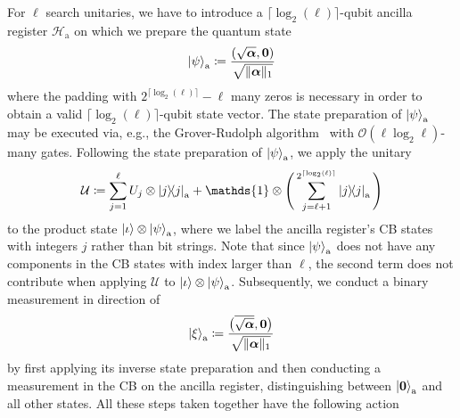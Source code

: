 \documentclass[10pt,conference]{IEEEtran}
\DeclareMathOperator{\ancilla}{a}     %
\newcommand*{\hil}{\mathcal{H}}       %
\newcommand*{\one}{\mathds{1}}        %
\begin{document}
For $\ell$ search unitaries, we have to introduce a $\lceil\log_{2}(\ell)\rceil$-qubit ancilla register $\hil_{\ancilla}$ on which we prepare the quantum state
\begin{align}\label{equation:GenStatePreparation}
    \ket{\psi}_{\ancilla} \coloneqq \frac{(\sqrt{\bm{\alpha}}, \bm{0})}{\sqrt{\lVert\bm{\alpha}\rVert_{1}}}
\end{align}
where the padding with $2^{\lceil \log_{2}(\ell)\rceil} - \ell$ many zeros is necessary in order to obtain a valid $\lceil \log_{2}(\ell)\rceil$-qubit state vector.
The state preparation of $\ket{\psi}_{\ancilla}$ may be executed via, e.g., the Grover-Rudolph algorithm~\cite{Ramacciotti2024SimpleQuantumAlgorithmToEfficientlyPrepareSparseStates} with $\mathcal{O}(\ell \log_{2} \ell)$-many gates.
Following the state preparation of $\ket{\psi}_{\ancilla}$, we apply the unitary
\begin{align}\label{equation:GenCompoundUnitary}
    \mathcal{U} \coloneqq \sum_{j = 1}^{\ell} U_{j} \otimes \ketbra{j}{j}_{\ancilla} + \one \otimes \Bigg(\sum_{j = \ell + 1}^{2^{\lceil \log_{2}(\ell)\rceil}} \ketbra{j}{j}_{\ancilla}\Bigg)
\end{align}
to the product state $\ket{\iota} \otimes \ket{\psi}_{\ancilla}$, where we label the ancilla register's CB states with integers $j$ rather than bit strings.
Note that since $\ket{\psi}_{\ancilla}$ does not have any components in the CB states with index larger than $\ell$, the second term does not contribute when applying $\mathcal{U}$ to $\ket{\iota} \otimes \ket{\psi}_{\ancilla}$.
Subsequently, we conduct a binary measurement in direction of
\begin{align}\label{equation:GenInverseStatePreparation}
    \ket{\xi}_{\ancilla} \coloneqq \frac{\big(\overline{\sqrt{\bm{\alpha}}}, \bm{0}\big)}{\sqrt{\lVert\bm{\alpha}\rVert_{1}}}
\end{align}
by first applying its inverse state preparation and then conducting a measurement in the CB on the ancilla register, distinguishing between $\ket{\bm{0}}_{\ancilla}$ and all other states.
All these steps taken together have the following action
\end{document}
